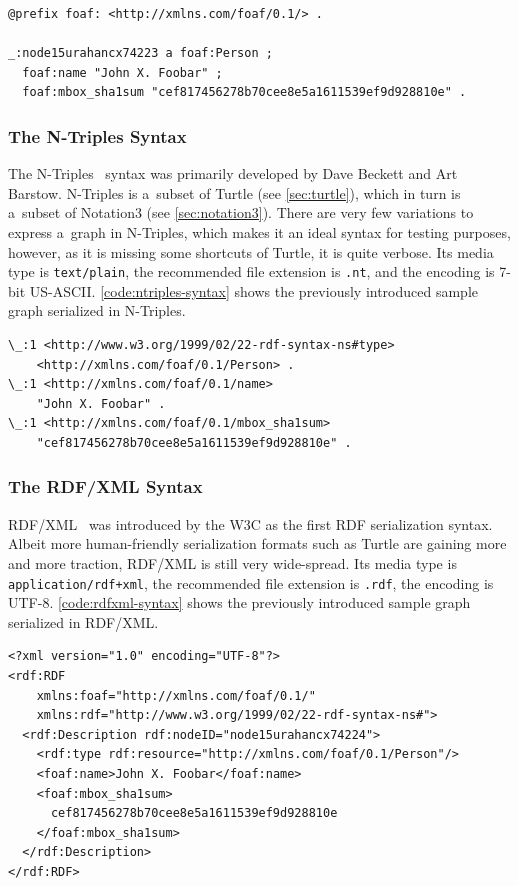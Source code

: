 \begin{lstlisting}[caption={A sample graph in Turtle syntax.},label={code:turtle-syntax}]
@prefix foaf: <http://xmlns.com/foaf/0.1/> .

_:node15urahancx74223 a foaf:Person ;
  foaf:name "John X. Foobar" ;
  foaf:mbox_sha1sum "cef817456278b70cee8e5a1611539ef9d928810e" .
\end{lstlisting}

\subsubsection{The N-Triples Syntax} \label{sec:n-triples}
The N-Triples~\cite{Grant2004} syntax was primarily developed by Dave Beckett and Art Barstow.
N-Triples is a~subset of Turtle (see \autoref{sec:turtle}),
which in turn is a~subset of Notation3 (see \autoref{sec:notation3}).
There are very few variations to express a~graph in N-Triples,
which makes it an ideal syntax for testing purposes, however,
as it is missing some shortcuts of Turtle, it is quite verbose.
Its media type is \texttt{text/plain}, the recommended file extension is \texttt{.nt},
and the encoding is 7-bit US-ASCII.
\autoref{code:ntriples-syntax} shows the previously introduced sample graph serialized in N-Triples.

\begin{lstlisting}[caption={A sample graph in N-Triples syntax.},label={code:ntriples-syntax}]
\_:1 <http://www.w3.org/1999/02/22-rdf-syntax-ns#type>
    <http://xmlns.com/foaf/0.1/Person> .
\_:1 <http://xmlns.com/foaf/0.1/name>
    "John X. Foobar" .
\_:1 <http://xmlns.com/foaf/0.1/mbox_sha1sum>
    "cef817456278b70cee8e5a1611539ef9d928810e" .
\end{lstlisting}

\subsubsection{The RDF/XML Syntax}
RDF/XML~\cite{Beckett2004} was introduced by the W3C as the first RDF serialization syntax.
Albeit more human-friendly serialization formats such as Turtle are gaining more and more traction,
RDF/XML is still very wide-spread.
Its media type is \texttt{application/rdf+xml}, the recommended file extension is \texttt{.rdf},
the encoding is UTF-8.
\autoref{code:rdfxml-syntax} shows the previously introduced sample graph serialized in RDF/XML.

\begin{lstlisting}[caption={A sample graph in RDF/XML syntax.},label={code:rdfxml-syntax}]
<?xml version="1.0" encoding="UTF-8"?>
<rdf:RDF
    xmlns:foaf="http://xmlns.com/foaf/0.1/"
    xmlns:rdf="http://www.w3.org/1999/02/22-rdf-syntax-ns#">
  <rdf:Description rdf:nodeID="node15urahancx74224">
    <rdf:type rdf:resource="http://xmlns.com/foaf/0.1/Person"/>
    <foaf:name>John X. Foobar</foaf:name>
    <foaf:mbox_sha1sum>
      cef817456278b70cee8e5a1611539ef9d928810e
    </foaf:mbox_sha1sum>
  </rdf:Description>
</rdf:RDF>
\end{lstlisting}

